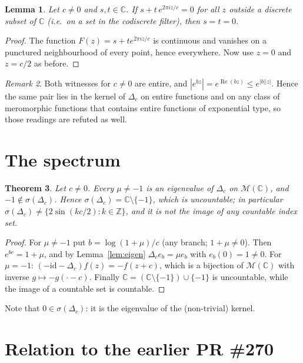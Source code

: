 \documentclass[11pt]{article}
\newtheorem{theorem}{Theorem}
\newtheorem{lemma}[theorem]{Lemma}
\theoremstyle{definition}
\theoremstyle{remark}
\newtheorem{remark}[theorem]{Remark}
\renewcommand{\_}{\oldus\allowbreak}
\newcommand{\M}{\mathcal{M}(\mathbb{C})}
\begin{document}
\begin{lemma}\label{lem:germ}
Let $c\neq0$ and $s,t\in\mathbb{C}$. If $s+t\,e^{2\pi i z/c}=0$ for all $z$ outside a discrete subset
of $\mathbb{C}$ (i.e.\ on a set in the codiscrete filter), then $s=t=0$.
\end{lemma}
\begin{proof}
The function $F(z)=s+te^{2\pi iz/c}$ is continuous and vanishes on a punctured neighbourhood of every
point, hence everywhere. Now use $z=0$ and $z=c/2$ as before.
\end{proof}

\begin{remark}
Both witnesses for $c\neq 0$ are entire, and $|e^{bz}|=e^{\operatorname{Re}(bz)}\le e^{|b||z|}$. Hence the
same pair lies in the kernel of $\Delta_c$ on entire functions and on any class of meromorphic functions
that contains entire functions of exponential type, so those readings are refuted as well.
\end{remark}

\section{The spectrum}

\begin{theorem}\label{thm:spec}
Let $c\neq0$. Every $\mu\neq-1$ is an eigenvalue of $\Delta_c$ on $\M$, and $-1\notin\sigma(\Delta_c)$.
Hence $\sigma(\Delta_c)=\mathbb{C}\setminus\{-1\}$, which is uncountable; in particular
$\sigma(\Delta_c)\ne\{2\sin(kc/2):k\in\mathbb{Z}\}$, and it is not the image of any countable index set.
\end{theorem}
\begin{proof}
For $\mu\neq-1$ put $b=\log(1+\mu)/c$ (any branch; $1+\mu\neq0$). Then $e^{bc}=1+\mu$, and by
Lemma~\ref{lem:eigen} $\Delta_c e_b=\mu e_b$ with $e_b(0)=1\neq0$. For $\mu=-1$:
$(-\mathrm{id}-\Delta_c)f(z) = -f(z+c)$, which is a bijection of $\M$ with inverse $g\mapsto
-g(\cdot-c)$. Finally $\mathbb{C}=(\mathbb{C}\setminus\{-1\})\cup\{-1\}$ is uncountable, while the image of
a countable set is countable.
\end{proof}

Note that $0\in\sigma(\Delta_c)$: it is the eigenvalue of the (non-trivial) kernel.

\section{Relation to the earlier PR \#270}
\end{document}
